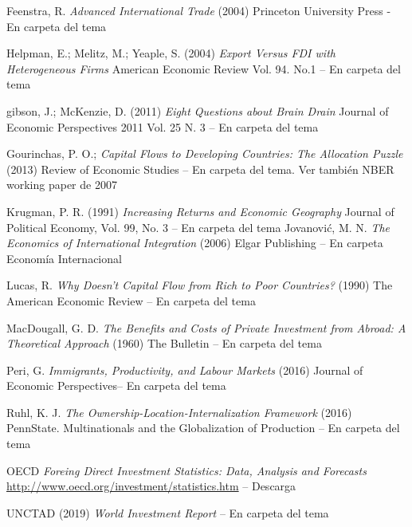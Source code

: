 \documentclass{nuevotema}
\begin{document}
Feenstra, R. \textit{Advanced International Trade} (2004) Princeton University Press - En carpeta del tema

Helpman, E.; Melitz, M.; Yeaple, S. (2004) \textit{Export Versus FDI with Heterogeneous Firms} American Economic Review Vol. 94. No.1 -- En carpeta del tema

gibson, J.; McKenzie, D. (2011) \textit{Eight Questions about Brain Drain} Journal of Economic Perspectives 2011 Vol. 25 N. 3 -- En carpeta del tema

Gourinchas, P. O.;  \textit{Capital Flows to Developing Countries: The Allocation Puzzle} (2013) Review of Economic Studies -- En carpeta del tema. Ver también NBER working paper de 2007

Krugman, P. R. (1991) \textit{Increasing Returns and Economic Geography} Journal of Political Economy, Vol. 99, No. 3 -- En carpeta del tema
Jovanović, M. N. \textit{The Economics of International Integration} (2006) Elgar Publishing -- En carpeta Economía Internacional

Lucas, R. \textit{Why Doesn't Capital Flow from Rich to Poor Countries?} (1990) The American Economic Review -- En carpeta del tema

MacDougall, G. D. \textit{The Benefits and Costs of Private Investment from Abroad: A Theoretical Approach} (1960) The Bulletin -- En carpeta del tema

Peri, G. \textit{Immigrants, Productivity, and Labour Markets} (2016) Journal of Economic Perspectives-- En carpeta del tema

Ruhl, K. J. \textit{The Ownership-Location-Internalization Framework} (2016) PennState. Multinationals and the Globalization of Production -- En carpeta del tema

OECD \textit{Foreing Direct Investment Statistics: Data, Analysis and Forecasts} \url{http://www.oecd.org/investment/statistics.htm} -- Descarga 

UNCTAD (2019) \textit{World Investment Report} -- En carpeta del tema
\end{document}
